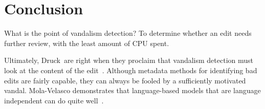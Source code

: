 \section{Conclusion}


What is the point of vandalism detection?
To determine whether an edit needs further review,
with the least amount of CPU spent.

Ultimately, Druck~\etal are right when they proclaim that
vandalism detection must look at the content of the
edit~\cite{Druck2008}.
Although metadata methods for identifying bad edits are
fairly capable, they can always be fooled by a sufficiently
motivated vandal.
Mola-Velasco demonstrates that language-based
models that are language independent can do quite
well~\cite{Mola2011}.


